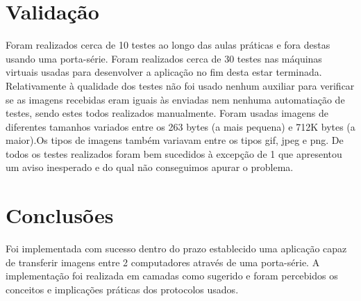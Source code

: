 \documentclass[11pt,a4paper,reqno]{report}
\numberwithin{equation}{section}
\begin{document}
\chapter{Validação}

Foram realizados cerca de 10 testes ao longo das aulas práticas e fora destas usando uma porta-série.
Foram realizados cerca de 30 testes nas máquinas virtuais usadas para desenvolver a aplicação no fim desta estar terminada.
Relativamente à qualidade dos testes não foi usado nenhum auxiliar para verificar se as imagens recebidas eram iguais às enviadas nem nenhuma automatiação de testes, sendo estes todos realizados manualmente. 
Foram usadas imagens de diferentes tamanhos variados entre os 263 bytes (a mais pequena) e 712K bytes (a maior).Os tipos de imagens também variavam entre os tipos gif, jpeg e png.
De todos os testes realizados foram bem sucedidos à excepção de 1 que apresentou um aviso inesperado e do qual não conseguimos apurar o problema.

\chapter{Conclusões}

Foi implementada com sucesso dentro do prazo establecido uma aplicação capaz de transferir imagens entre 2 computadores através de uma porta-série.
A implementação foi realizada em camadas como sugerido e foram percebidos os conceitos e implicações práticas dos protocolos usados.




\end{document}
